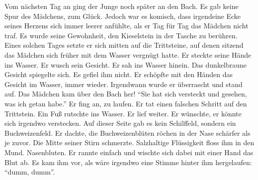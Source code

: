 \documentclass[prd,12pt,tightenlines,notitlepage,nofootinbib]{revtex4-1}
\begin{document}
Vom nächsten Tag an ging der Junge noch später an den Bach.  Es gab
keine Spur %
des Mädchens, zum Glück.  Jedoch war es komisch, dass
irgendeine Ecke seines Herzens sich immer leerer anfühlte, als er Tag für
Tag das Mädchen nicht traf.  Es wurde seine Gewohnheit, den
Kieselstein in der Tasche zu berühren.  Eines solchen Tages setzte er
sich mitten auf die Trittsteine, auf denen sitzend das Mädchen sich früher mit
dem Wasser vergnügt hatte.  Er steckte seine Hände ins Wasser.
Er wusch sein Gesicht.  Er sah ins Wasser hinein.  Das dunkelbraune
Gesicht spiegelte sich.  Es gefiel ihm nicht.  Er schöpfte mit den
Händen das Gesicht im Wasser, immer wieder.  Irgendwann wurde er
überrascht und stand auf.  Das Mädchen kam über den Bach her!
"`Sie hat sich versteckt und gesehen, was ich getan habe."'
Er fing an,
zu laufen.  Er tat einen falschen Schritt auf den Trittstein.  Ein
Fuß rutschte ins Wasser.  Er lief weiter.  Er wünschte, er könnte sich irgendwo
verstecken.  Auf dieser Seite gab es kein Schilffeld, sondern ein Buchweizenfeld.
Er dachte, die Buchweizenblüten röchen in der Nase schärfer als je
zuvor.  Die Mitte seiner Stirn schmerzte.  Salzhaltige Flüssigkeit floss ihm
in den Mund.  Nasenbluten.  Er rannte einfach und wischte sich dabei
mit einer Hand das Blut ab.  Es kam ihm vor, als wäre irgendwo eine
Stimme hinter ihm hergelaufen: "`dumm, dumm"'.
\end{document}
